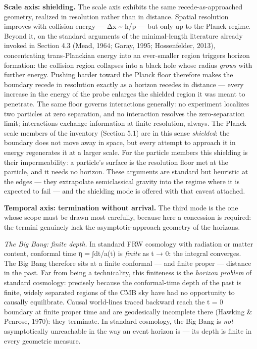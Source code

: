 \documentclass[
]{article}
\begin{document}
\textbf{Scale axis: shielding.} The scale axis exhibits the same
recede-as-approached geometry, realized in resolution rather than in
distance. Spatial resolution improves with collision energy --- Δx
\textasciitilde{} ħ/p --- but only up to the Planck regime. Beyond it,
on the standard arguments of the minimal-length literature already
invoked in Section 4.3 (Mead, 1964; Garay, 1995; Hossenfelder, 2013),
concentrating trans-Planckian energy into an ever-smaller region
triggers horizon formation: the collision region collapses into a black
hole whose radius \emph{grows} with further energy. Pushing harder
toward the Planck floor therefore makes the boundary recede in
resolution exactly as a horizon recedes in distance --- every increase
in the energy of the probe enlarges the shielded region it was meant to
penetrate. The same floor governs interactions generally: no experiment
localizes two particles at zero separation, and no interaction resolves
the zero-separation limit; interactions exchange information at finite
resolution, always. The Planck-scale members of the inventory (Section
5.1) are in this sense \emph{shielded}: the boundary does not move away
in space, but every attempt to approach it in energy regenerates it at a
larger scale. For the particle members this shielding is their
impermeability: a particle's surface is the resolution floor met at the
particle, and it needs no horizon. These arguments are standard but
heuristic at the edges --- they extrapolate semiclassical gravity into
the regime where it is expected to fail --- and the shielding mode is
offered with that caveat attached.

\textbf{Temporal axis: termination without arrival.} The third mode is
the one whose scope must be drawn most carefully, because here a
concession is required: the termini genuinely lack the
asymptotic-approach geometry of the horizons.

\emph{The Big Bang: finite depth.} In standard FRW cosmology with
radiation or matter content, conformal time η = ∫dt/a(t) is
\emph{finite} as t → 0: the integral converges. The Big Bang therefore
sits at a finite conformal --- and finite proper --- distance in the
past. Far from being a technicality, this finiteness is the
\emph{horizon problem} of standard cosmology: precisely because the
conformal-time depth of the past is finite, widely separated regions of
the CMB sky have had no opportunity to causally equilibrate. Causal
world-lines traced backward reach the t = 0 boundary at finite proper
time and are geodesically incomplete there (Hawking \& Penrose, 1970):
they terminate. In standard cosmology, the Big Bang is \emph{not}
asymptotically unreachable in the way an event horizon is --- its depth
is finite in every geometric measure.
\end{document}
